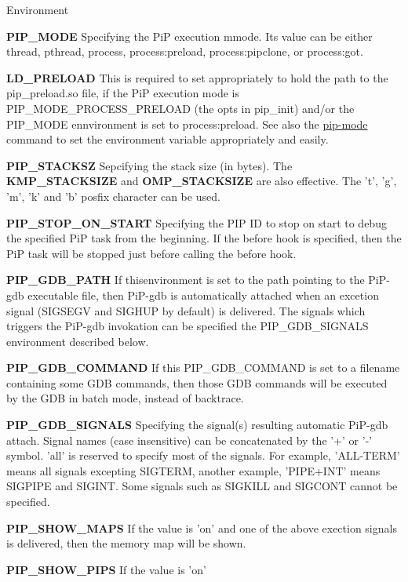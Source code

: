 \begin{DoxyParagraph}{Environment}
\begin{DoxyItemize}
\item {\bfseries P\-I\-P\-\_\-\-M\-O\-D\-E} Specifying the Pi\-P execution mmode. Its value can be either {\ttfamily thread}, {\ttfamily pthread}, {\ttfamily process}, {\ttfamily process\-:preload}, {\ttfamily process\-:pipclone}, or {\ttfamily process\-:got}. \item {\bfseries L\-D\-\_\-\-P\-R\-E\-L\-O\-A\-D} This is required to set appropriately to hold the path to the {\ttfamily pip\-\_\-preload.\-so} file, if the Pi\-P execution mode is {\ttfamily P\-I\-P\-\_\-\-M\-O\-D\-E\-\_\-\-P\-R\-O\-C\-E\-S\-S\-\_\-\-P\-R\-E\-L\-O\-A\-D} (the {\ttfamily opts} in {\ttfamily pip\-\_\-init}) and/or the P\-I\-P\-\_\-\-M\-O\-D\-E ennvironment is set to {\ttfamily process\-:preload}. See also the \hyperlink{pip-mode}{pip-\/mode} command to set the environment variable appropriately and easily. \item {\bfseries P\-I\-P\-\_\-\-S\-T\-A\-C\-K\-S\-Z} Sepcifying the stack size (in bytes). The {\bfseries K\-M\-P\-\_\-\-S\-T\-A\-C\-K\-S\-I\-Z\-E} and {\bfseries O\-M\-P\-\_\-\-S\-T\-A\-C\-K\-S\-I\-Z\-E} are also effective. The 't', 'g', 'm', 'k' and 'b' posfix character can be used. \item {\bfseries P\-I\-P\-\_\-\-S\-T\-O\-P\-\_\-\-O\-N\-\_\-\-S\-T\-A\-R\-T} Specifying the P\-I\-P I\-D to stop on start to debug the specified Pi\-P task from the beginning. If the before hook is specified, then the Pi\-P task will be stopped just before calling the before hook. \item {\bfseries P\-I\-P\-\_\-\-G\-D\-B\-\_\-\-P\-A\-T\-H} If thisenvironment is set to the path pointing to the Pi\-P-\/gdb executable file, then Pi\-P-\/gdb is automatically attached when an excetion signal (S\-I\-G\-S\-E\-G\-V and S\-I\-G\-H\-U\-P by default) is delivered. The signals which triggers the Pi\-P-\/gdb invokation can be specified the {\ttfamily P\-I\-P\-\_\-\-G\-D\-B\-\_\-\-S\-I\-G\-N\-A\-L\-S} environment described below. \item {\bfseries P\-I\-P\-\_\-\-G\-D\-B\-\_\-\-C\-O\-M\-M\-A\-N\-D} If this P\-I\-P\-\_\-\-G\-D\-B\-\_\-\-C\-O\-M\-M\-A\-N\-D is set to a filename containing some G\-D\-B commands, then those G\-D\-B commands will be executed by the G\-D\-B in batch mode, instead of backtrace. \item {\bfseries P\-I\-P\-\_\-\-G\-D\-B\-\_\-\-S\-I\-G\-N\-A\-L\-S} Specifying the signal(s) resulting automatic Pi\-P-\/gdb attach. Signal names (case insensitive) can be concatenated by the '+' or '-\/' symbol. 'all' is reserved to specify most of the signals. For example, 'A\-L\-L-\/\-T\-E\-R\-M' means all signals excepting {\ttfamily S\-I\-G\-T\-E\-R\-M}, another example, 'P\-I\-P\-E+\-I\-N\-T' means {\ttfamily S\-I\-G\-P\-I\-P\-E} and {\ttfamily S\-I\-G\-I\-N\-T}. Some signals such as S\-I\-G\-K\-I\-L\-L and S\-I\-G\-C\-O\-N\-T cannot be specified. \item {\bfseries P\-I\-P\-\_\-\-S\-H\-O\-W\-\_\-\-M\-A\-P\-S} If the value is 'on' and one of the above exection signals is delivered, then the memory map will be shown. \item {\bfseries P\-I\-P\-\_\-\-S\-H\-O\-W\-\_\-\-P\-I\-P\-S} If the value is 'on' 
\end{DoxyItemize}
\end{DoxyParagraph}
